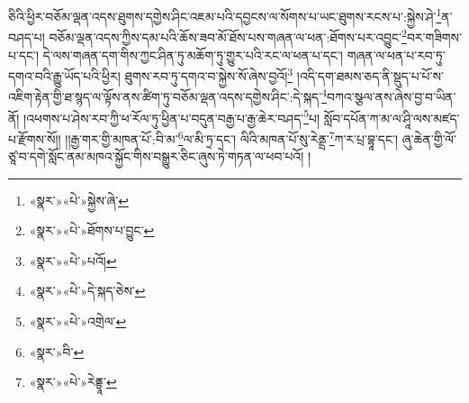 ཅིའི་ཕྱིར་བཅོམ་ལྡན་འདས་ཐུགས་དགྱེས་ཤིང་འཇམ་པའི་དབྱངས་ལ་སོགས་པ་ཡང་ཐུགས་རངས་པ་:སྐྱེས་ཤེ་\footnote{«སྣར་»«པེ་»སྐྱེས་ཞེ་}ན་བཤད་པ། བཅོམ་ལྡན་འདས་ཀྱིས་དམ་པའི་ཆོས་ཟབ་མོ་ཐོས་པས་གཞན་ལ་ཕན་:ཐོགས་པར་འབྱུང་\footnote{«སྣར་»«པེ་»ཐོགས་པ་བྱུང་}བར་གཟིགས་པ་དང་། དེ་ལས་གཞན་དག་གིས་ཀྱང་ཤིན་ཏུ་མཆོག་ཏུ་གྱུར་པའི་རང་ལ་ཕན་པ་དང་། གཞན་ལ་ཕན་པ་རབ་ཏུ་དགའ་བའི་རྒྱུ་ཡོད་པའི་ཕྱིར། ཐུགས་རབ་ཏུ་དགའ་བ་སྐྱེས་སོ་ཞེས་བྱའོ།\footnote{«སྣར་»«པེ་»པའོ།} །འདི་དག་ཐམས་ཅད་ནི་སྡུད་པ་པོ་ས་འཇིག་རྟེན་གྱི་ཐ་སྙད་ལ་ལྟོས་ནས་ཚིག་ཏུ་བཅོམ་ལྡན་འདས་དགྱེས་ཤིང་:དེ་སྐད་\footnote{«སྣར་»«པེ་»དེ་སྐད་ཅེས་}བཀའ་སྩལ་ནས་ཞེས་བྱ་བ་ཡིན་ནོ། །འཕགས་པ་ཤེས་རབ་ཀྱི་ཕ་རོལ་ཏུ་ཕྱིན་པ་བདུན་བརྒྱ་པ་རྒྱ་ཆེར་བཤད་\footnote{«སྣར་»«པེ་»འགྲེལ་}པ། སློབ་དཔོན་ཀ་མ་ལ་ཤཱི་ལས་མཛད་པ་རྫོགས་སོ།། །།རྒྱ་གར་གྱི་མཁན་པོ་:བི་མ་\footnote{«སྣར་»བི་}ལ་མི་ཏྲ་དང་། ལིའི་མཁན་པོ་སུ་རེནྡྲ་\footnote{«སྣར་»«པེ་»རེནྟྲཱ་}ཀ་ར་པྲ་བྷཱ་དང་། ཞུ་ཆེན་གྱི་ལོ་ཙཱ་བ་དགེ་སློང་ནམ་མཁའ་སྐྱོང་གིས་བསྒྱུར་ཅིང་ཞུས་ཏེ་གཏན་ལ་ཕབ་པའོ། །
